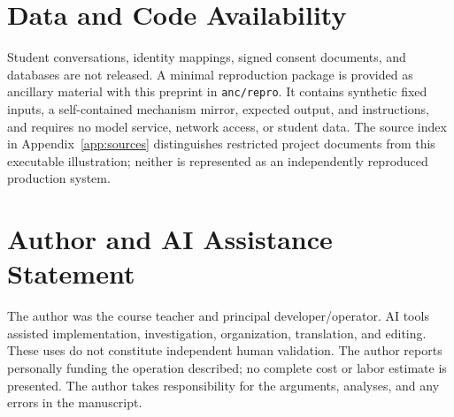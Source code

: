 \documentclass[11pt,a4paper]{article}
\begin{document}
\section*{Data and Code Availability}
Student conversations, identity mappings, signed consent documents, and databases are not released. A minimal reproduction package is provided as ancillary material with this preprint in \texttt{anc/repro}. It contains synthetic fixed inputs, a self-contained mechanism mirror, expected output, and instructions, and requires no model service, network access, or student data. The source index in Appendix~\ref{app:sources} distinguishes restricted project documents from this executable illustration; neither is represented as an independently reproduced production system.

\section*{Author and AI Assistance Statement}
The author was the course teacher and principal developer/operator. AI tools assisted implementation, investigation, organization, translation, and editing. These uses do not constitute independent human validation. The author reports personally funding the operation described; no complete cost or labor estimate is presented. The author takes responsibility for the arguments, analyses, and any errors in the manuscript.
\end{document}
